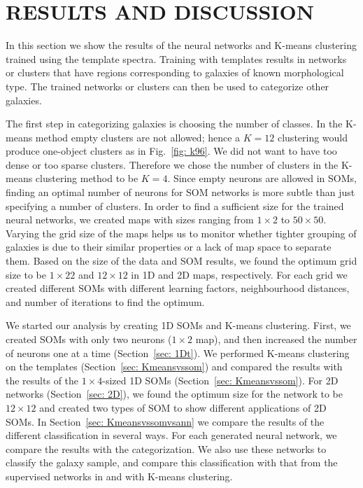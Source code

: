 \section{RESULTS AND DISCUSSION}
\label{sec: result}

    In this section we show the results of the neural networks and K-means clustering trained using the  template spectra.
    Training with  templates results in networks or clusters that have regions corresponding to galaxies of known morphological type. 
    The trained networks or clusters can then be used to categorize other galaxies.

    The first step in categorizing galaxies is choosing the number of classes.
    In the K-means method empty clusters are not allowed; 
    hence a $K=12$ clustering would produce one-object clusters as in Fig.~\ref{fig: k96}.
    We did not want to have too dense or too sparse clusters.
    Therefore we chose the number of clusters in the K-means clustering method to be $K=4$.
    Since empty neurons are allowed in SOMs, finding an optimal number of neurons for SOM networks is more subtle than just specifying a number of clusters. 
    In order to find a sufficient size for the trained neural networks, we created maps with sizes ranging from $1\times2$ to $50\times50$.
    Varying the grid size of the maps helps us to monitor whether tighter grouping of galaxies is due to their similar properties or a lack of map space to separate them.
    Based on the size of the data and SOM results, we found the optimum grid size to be $1\times22$ and $12\times12$ in 1D and 2D maps, respectively. 
    For each grid we created different SOMs with different learning factors, neighbourhood distances, and number of iterations to find the optimum.
   
    We started our analysis by creating 1D SOMs and K-means clustering. 
    First, we created SOMs with only two neurons ($1\times2$ map), and then increased the number of neurons one at a time (Section~\ref{sec: 1Dt}).
    We performed K-means clustering on the  templates (Section~\ref{sec: Kmeansvssom}) and compared 
   the results with the results of the $1\times4$-sized 1D SOMs (Section~\ref{sec: Kmeansvssom}).
    For 2D networks (Section~\ref{sec: 2D}), we found the optimum size for the network to be $12\times12$ and created two types of SOM to show different applications of 2D SOMs.
    In Section~\ref{sec: Kmeansvssomvsann} we compare the results of the different classification in several ways. 
    For each generated neural network, we compare the results with the  categorization.
    We also use these networks to classify the  galaxy sample, and compare this classification with that from the supervised networks in  and with K-means clustering.



